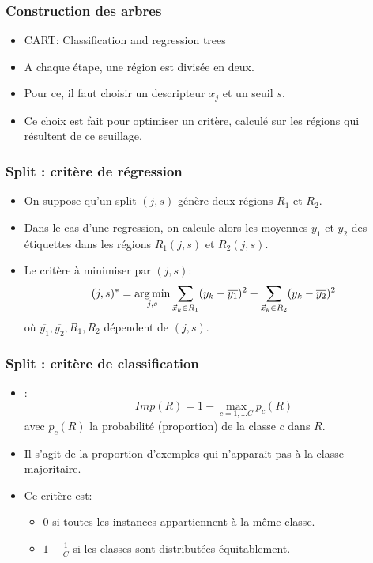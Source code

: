 \begin{frame}
  \frametitle{Construction des arbres}
  \begin{itemize}
    \item CART: Classification and regression trees
    \item A chaque étape, une région est divisée en deux. 
    \item Pour ce, il faut choisir un descripteur $x_j$ et un seuil $s$. 
    \item Ce choix est fait pour optimiser un critère, calculé sur les régions qui résultent de ce seuillage. 
  \end{itemize}
\end{frame}

\begin{frame}
  \frametitle{Split : critère de régression}
  \begin{itemize}
    \item On suppose qu'un split $(j,s)$ génère deux régions $R_1$ et $R_2$. 
    \item Dans le cas d'une regression, on calcule alors les moyennes $\overline{y_1}$ et $\overline{y_2}$ des étiquettes dans les régions $R_1(j,s)$ et $R_2(j,s)$. 
    \item Le critère à minimiser par $(j,s)$:
    \begin{equation*}
    (j,s)^{\ast} = \operatorname*{arg\,min}_{j,s}\sum_{\vec{x}_k \in R_1} (y_k-\overline{y_1})^2 + \sum_{\vec{x}_k \in R_2}(y_k-\overline{y_2})^2
    \end{equation*}
    où $\overline{y_1}, \overline{y_2}, R_1, R_2$ dépendent de $(j,s)$. 
  \end{itemize}
\end{frame}

\begin{frame}
  \frametitle{Split : critère de classification}
  \begin{itemize}
    \item {} :  
    \begin{equation*}
    Imp(R) = 1- \max_{c=1, \ldots C}p_c(R)
    \end{equation*}
    avec $p_c(R)$ la probabilité (proportion) de la classe $c$ dans $R$. 
    \item Il s'agit de la proportion d'exemples qui n'apparait pas à la classe majoritaire. 
    \item Ce critère est:
    \begin{itemize}
      \item 0 si toutes les instances appartiennent à la même classe.
      \item $1-\frac{1}{C}$ si les classes sont distributées équitablement.
    \end{itemize}
  \end{itemize}
\end{frame}

